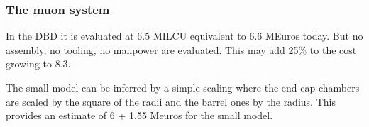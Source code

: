 

\subsubsection{The muon system}
In the DBD it is evaluated at 6.5 MILCU equivalent to 6.6 MEuros today. But no assembly, no tooling, no manpower are evaluated. This may add 25\% to the cost growing to 8.3.

The small model can be inferred by a simple scaling where the end cap chambers are scaled by the square of the radii and the barrel ones by the radius. This provides an estimate of 6 + 1.55 Meuros for the small  model.

